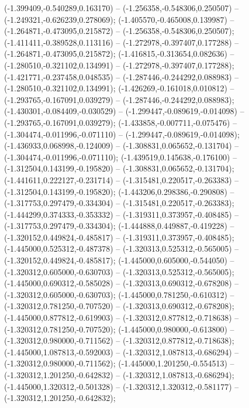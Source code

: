  (-1.399409,-0.540289,0.163170) -- (-1.256358,-0.548306,0.250507) -- (-1.249321,-0.626239,0.278069);
 (-1.405570,-0.465008,0.139987) -- (-1.264871,-0.473095,0.215872) -- (-1.256358,-0.548306,0.250507);
 (-1.411411,-0.389528,0.113116) -- (-1.272978,-0.397407,0.177288) -- (-1.264871,-0.473095,0.215872);
 (-1.416815,-0.313654,0.082636) -- (-1.280510,-0.321102,0.134991) -- (-1.272978,-0.397407,0.177288);
 (-1.421771,-0.237458,0.048535) -- (-1.287446,-0.244292,0.088983) -- (-1.280510,-0.321102,0.134991);
 (-1.426269,-0.161018,0.010812) -- (-1.293765,-0.167091,0.039279) -- (-1.287446,-0.244292,0.088983);
 (-1.430301,-0.084409,-0.030529) -- (-1.299447,-0.089619,-0.014098) -- (-1.293765,-0.167091,0.039279);
 (-1.433858,-0.007711,-0.075476) -- (-1.304474,-0.011996,-0.071110) -- (-1.299447,-0.089619,-0.014098);
 (-1.436933,0.068998,-0.124009) -- (-1.308831,0.065652,-0.131704) -- (-1.304474,-0.011996,-0.071110);
 (-1.439519,0.145638,-0.176100) -- (-1.312504,0.143199,-0.195820) -- (-1.308831,0.065652,-0.131704);
 (-1.441611,0.222127,-0.231714) -- (-1.315481,0.220517,-0.263383) -- (-1.312504,0.143199,-0.195820);
 (-1.443206,0.298386,-0.290808) -- (-1.317753,0.297479,-0.334304) -- (-1.315481,0.220517,-0.263383);
 (-1.444299,0.374333,-0.353332) -- (-1.319311,0.373957,-0.408485) -- (-1.317753,0.297479,-0.334304);
 (-1.444888,0.449887,-0.419228) -- (-1.320152,0.449824,-0.485817) -- (-1.319311,0.373957,-0.408485);
 (-1.445000,0.525312,-0.487378) -- (-1.320313,0.525312,-0.565005) -- (-1.320152,0.449824,-0.485817);
 (-1.445000,0.605000,-0.544050) -- (-1.320312,0.605000,-0.630703) -- (-1.320313,0.525312,-0.565005);
 (-1.445000,0.690312,-0.585028) -- (-1.320313,0.690312,-0.678208) -- (-1.320312,0.605000,-0.630703);
 (-1.445000,0.781250,-0.610312) -- (-1.320312,0.781250,-0.707520) -- (-1.320313,0.690312,-0.678208);
 (-1.445000,0.877812,-0.619903) -- (-1.320312,0.877812,-0.718638) -- (-1.320312,0.781250,-0.707520);
 (-1.445000,0.980000,-0.613800) -- (-1.320312,0.980000,-0.711562) -- (-1.320312,0.877812,-0.718638);
 (-1.445000,1.087813,-0.592003) -- (-1.320312,1.087813,-0.686294) -- (-1.320312,0.980000,-0.711562);
 (-1.445000,1.201250,-0.554513) -- (-1.320312,1.201250,-0.642832) -- (-1.320312,1.087813,-0.686294);
 (-1.445000,1.320312,-0.501328) -- (-1.320312,1.320312,-0.581177) -- (-1.320312,1.201250,-0.642832);
